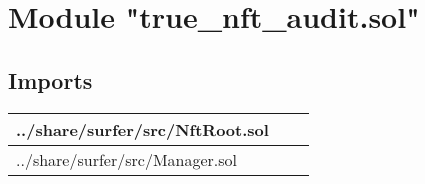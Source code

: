 
\section{Module "true\_{}nft\_{}audit.sol"}


\subsection{Imports}


\noindent\begin{tabular}{|l|l|p{5cm}|}\hline
../share/surfer/src/NftRoot.sol &\\\hline
../share/surfer/src/Manager.sol &\\\hline
\end{tabular}

